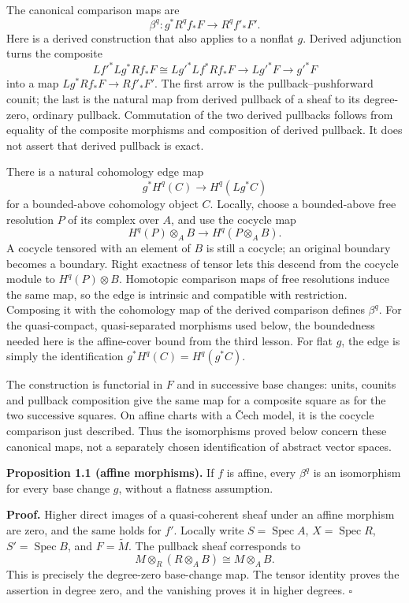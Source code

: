 \documentclass[11pt]{article}
\begin{document}
The canonical comparison maps are \[
\beta^q:g^*R^qf_*F\longrightarrow R^qf'_*F'.
\] Here is a derived construction that also applies to a nonflat \(g\).
Derived adjunction turns the composite \[
Lf'^*Lg^*Rf_*F
\cong Lg'^*Lf^*Rf_*F
\longrightarrow Lg'^*F
\longrightarrow g'^*F
\] into a map \(Lg^*Rf_*F\to Rf'_*F'\). The first arrow is the
pullback--pushforward counit; the last is the natural map from derived
pullback of a sheaf to its degree-zero, ordinary pullback. Commutation
of the two derived pullbacks follows from equality of the composite
morphisms and composition of derived pullback. It does not assert that
derived pullback is exact.

There is a natural cohomology edge map \[
g^*H^q(C)\longrightarrow H^q(Lg^*C)
\] for a bounded-above cohomology object \(C\). Locally, choose a
bounded-above free resolution \(P\) of its complex over \(A\), and use
the cocycle map \[
H^q(P)\otimes_A B\longrightarrow H^q(P\otimes_A B).
\] A cocycle tensored with an element of \(B\) is still a cocycle; an
original boundary becomes a boundary. Right exactness of tensor lets
this descend from the cocycle module to \(H^q(P)\otimes B\). Homotopic
comparison maps of free resolutions induce the same map, so the edge is
intrinsic and compatible with restriction. Composing it with the
cohomology map of the derived comparison defines \(\beta^q\). For the
quasi-compact, quasi-separated morphisms used below, the boundedness
needed here is the affine-cover bound from the third lesson. For flat
\(g\), the edge is simply the identification \(g^*H^q(C)=H^q(g^*C)\).

The construction is functorial in \(F\) and in successive base changes:
units, counits and pullback composition give the same map for a
composite square as for the two successive squares. On affine charts
with a Čech model, it is the cocycle comparison just described. Thus the
isomorphisms proved below concern these canonical maps, not a separately
chosen identification of abstract vector spaces.

\textbf{Proposition 1.1 (affine morphisms).} If \(f\) is affine, every
\(\beta^q\) is an isomorphism for every base change \(g\), without a
flatness assumption.

\textbf{Proof.} Higher direct images of a quasi-coherent sheaf under an
affine morphism are zero, and the same holds for \(f'\). Locally write
\(S=\operatorname{Spec}A\), \(X=\operatorname{Spec}R\),
\(S'=\operatorname{Spec}B\), and \(F=\widetilde M\). The pullback sheaf
corresponds to \[
M\otimes_R(R\otimes_A B)\cong M\otimes_A B.
\] This is precisely the degree-zero base-change map. The tensor
identity proves the assertion in degree zero, and the vanishing proves
it in higher degrees. \(\square\)
\end{document}
